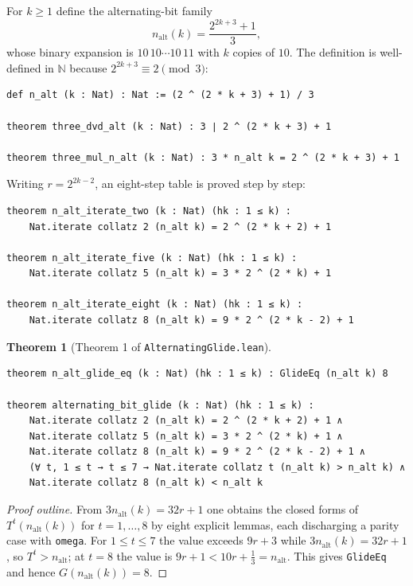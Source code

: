 \documentclass[11pt,a4paper]{article}
\newtheorem{theorem}{Theorem}[section]
\begin{document}
For $k\ge 1$ define the alternating-bit family
\[
  n_{\mathrm{alt}}(k)=\frac{2^{2k+3}+1}{3},
\]
whose binary expansion is $10\,10\cdots 10\,11$ with $k$ copies of $10$.  The
definition is well-defined in $\mathbb{N}$ because $2^{2k+3}\equiv 2\pmod 3$:

\begin{lstlisting}
def n_alt (k : Nat) : Nat := (2 ^ (2 * k + 3) + 1) / 3

theorem three_dvd_alt (k : Nat) : 3 ∣ 2 ^ (2 * k + 3) + 1

theorem three_mul_n_alt (k : Nat) : 3 * n_alt k = 2 ^ (2 * k + 3) + 1
\end{lstlisting}

\noindent Writing $r=2^{2k-2}$, an eight-step table is proved step by step:

\begin{lstlisting}
theorem n_alt_iterate_two (k : Nat) (hk : 1 ≤ k) :
    Nat.iterate collatz 2 (n_alt k) = 2 ^ (2 * k + 2) + 1

theorem n_alt_iterate_five (k : Nat) (hk : 1 ≤ k) :
    Nat.iterate collatz 5 (n_alt k) = 3 * 2 ^ (2 * k) + 1

theorem n_alt_iterate_eight (k : Nat) (hk : 1 ≤ k) :
    Nat.iterate collatz 8 (n_alt k) = 9 * 2 ^ (2 * k - 2) + 1
\end{lstlisting}

\begin{theorem}[Theorem 1 of \texttt{AlternatingGlide.lean}]
\label{thm:alt}
\leavevmode\par\vspace{0.3em}
\begin{lstlisting}
theorem n_alt_glide_eq (k : Nat) (hk : 1 ≤ k) : GlideEq (n_alt k) 8

theorem alternating_bit_glide (k : Nat) (hk : 1 ≤ k) :
    Nat.iterate collatz 2 (n_alt k) = 2 ^ (2 * k + 2) + 1 ∧
    Nat.iterate collatz 5 (n_alt k) = 3 * 2 ^ (2 * k) + 1 ∧
    Nat.iterate collatz 8 (n_alt k) = 9 * 2 ^ (2 * k - 2) + 1 ∧
    (∀ t, 1 ≤ t → t ≤ 7 → Nat.iterate collatz t (n_alt k) > n_alt k) ∧
    Nat.iterate collatz 8 (n_alt k) < n_alt k
\end{lstlisting}
\end{theorem}

\begin{proof}[Proof outline]
From $3n_{\mathrm{alt}}(k)=32r+1$ one obtains the closed forms of
$T^{t}(n_{\mathrm{alt}}(k))$ for $t=1,\dots,8$ by eight explicit lemmas, each
discharging a parity case with \texttt{omega}.  For $1\le t\le 7$ the value
exceeds $9r+3$ while $3n_{\mathrm{alt}}(k)=32r+1$, so $T^{t}>n_{\mathrm{alt}}$;
at $t=8$ the value is $9r+1<10r+\tfrac{1}{3}=n_{\mathrm{alt}}$.  This gives
\texttt{GlideEq} and hence $G(n_{\mathrm{alt}}(k))=8$.
\end{proof}
\end{document}
